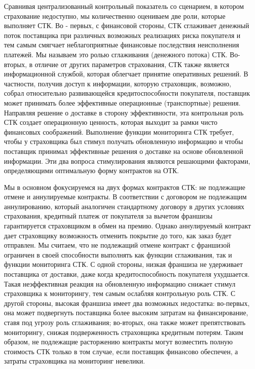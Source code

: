 \documentclass[a4paper,12pt]{article}
\begin{document}
Сравнивая централизованный контрольный показатель со сценарием, в котором страхование недоступно, мы количественно оцениваем две роли, которые выполняет СТК. Во - первых, с финансовой стороны, СТК сглаживает денежный поток поставщика при различных возможных реализациях риска покупателя и тем самым смягчает неблагоприятные финансовые последствия неисполнения платежей. Мы называем это ролью сглаживания (денежного потока) СТК. Во-вторых, в отличие от других параметров страхования, СТК также является информационной службой, которая облегчает принятие оперативных решений. В частности, получив доступ к информации, которую страховщик, возможно, собрал относительно развивающейся кредитоспособности покупателя, поставщик может принимать более эффективные операционные (транспортные) решения. Направляя решение о доставке в сторону эффективности, эта контрольная роль СТК создает операционную ценность, которая выходит за рамки чисто финансовых соображений. Выполнение функции мониторинга СТК требует, чтобы у страховщика был стимул получать обновленную информацию и чтобы поставщик принимал эффективные решения о доставке на основе обновленной информации. Эти два вопроса стимулирования являются решающими факторами, определяющими оптимальную форму контрактов на ОТК.

Мы в основном фокусируемся на двух формах контрактов СТК: не подлежащие отмене и аннулируемые контракты. В соответствии с договором не подлежащим аннулированию, который аналогичен стандартному договору в других условиях страхования, кредитный платеж от покупателя за вычетом франшизы гарантируется страховщиком в обмен на премию. Однако аннулируемый контракт дает страховщику возможность отменить покрытие до того, как заказ будет отправлен. Мы считаем, что не подлежащий отмене контракт с франшизой ограничен в своей способности выполнять как функции сглаживания, так и функции мониторинга СТК. С одной стороны, низкая франшиза не удерживает поставщика от доставки, даже когда кредитоспособность покупателя ухудшается. Такая неэффективная реакция на обновленную информацию снижает стимул страховщика к мониторингу, тем самым ослабляя контрольную роль СТК. С другой стороны, высокая франшиза имеет два возможных недостатка: во-первых, она может подвергнуть поставщика более высоким затратам на финансирование, ставя под угрозу роль сглаживания; во-вторых, она также может препятствовать мониторингу, снижая подверженность страховщика кредитным потерям. Таким образом, не подлежащие расторжению контракты могут возместить полную стоимость СТК только в том случае, если поставщик финансово обеспечен, а затраты страховщика на мониторинг невелики.
\end{document}
